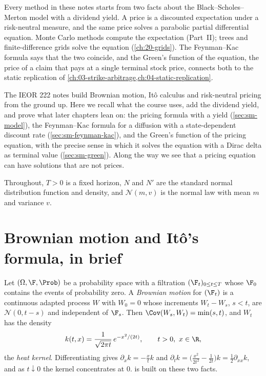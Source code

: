 
Every method in these notes starts from two facts about the Black--Scholes--Merton model with a
dividend yield. A price is a discounted expectation under a risk-neutral measure, and the same
price solves a parabolic partial differential equation. Monte Carlo methods compute the
expectation (Part~II); trees and finite-difference grids solve the equation
(\cref{ch:20-grids}). The Feynman--Kac formula says that the two coincide, and the Green's
function of the equation, the price of a claim that pays at a single terminal stock price,
connects both to the static replication of
\cref{ch:03-strike-arbitrage,ch:04-static-replication}.

The IEOR 222 notes build Brownian motion, It\^o calculus and risk-neutral pricing from the
ground up. Here we recall what the course uses, add the dividend yield, and prove what later
chapters lean on: the pricing formula with a yield (\cref{sec:sm-model}), the Feynman--Kac
formula for a diffusion with a state-dependent discount rate (\cref{sec:sm-feynman-kac}), and
the Green's function of the pricing equation, with the precise sense in which it solves the
equation with a Dirac delta as terminal value (\cref{sec:sm-green}). Along the way we see that a
pricing equation can have solutions that are not prices.

Throughout, $T>0$ is a fixed horizon, $N$ and $N'$ are the standard normal distribution
function and density, and $\mathcal N(m,v)$ is the normal law with mean $m$ and variance $v$.

\section{Brownian motion and It\^o's formula, in brief}\label{sec:sm-recap}

Let $(\Omega,\F,\Prob)$ be a probability space with a filtration $(\F_t)_{0\le t\le T}$ whose
$\F_0$ contains the events of probability zero. A \emph{Brownian motion} for $(\F_t)$ is a
continuous adapted process $W$ with $W_0=0$ whose increments $W_t-W_s$, $s<t$, are
$\mathcal N(0,t-s)$ and independent of $\F_s$. Then $\Cov(W_s,W_t)=\min(s,t)$, and $W_t$ has
the density
\begin{equation}\label{eq:sm-heat-kernel}
  k(t,x)=\frac{1}{\sqrt{2\pi t}}\,e^{-x^2/(2t)},\qquad t>0,\ x\in\R,
\end{equation}
the \emph{heat kernel}. Differentiating gives $\partial_xk=-\frac xtk$ and
$\partial_tk=\big(\frac{x^2}{2t^2}-\frac1{2t}\big)k=\frac12\partial_{xx}k$, and as $t\downarrow0$
the kernel concentrates at $0$.  is built on these two facts.

